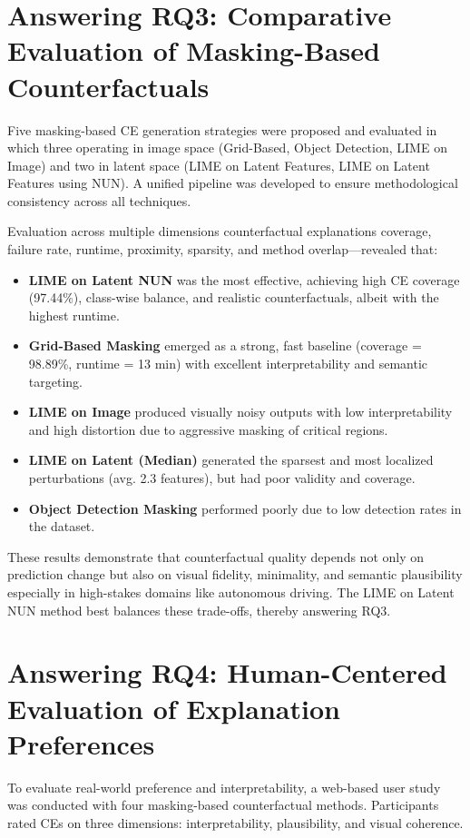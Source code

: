 \section{Answering RQ3: Comparative Evaluation of Masking-Based Counterfactuals}

Five masking-based CE generation strategies were proposed and evaluated in which three operating in image space (Grid-Based, Object Detection, LIME on Image) and two in latent space (LIME on Latent Features, LIME on Latent Features using NUN). A unified pipeline was developed to ensure methodological consistency across all techniques.

Evaluation across multiple dimensions counterfactual explanations coverage, failure rate, runtime, proximity, sparsity, and method overlap—revealed that:

\begin{itemize}
    \item \textbf{LIME on Latent NUN} was the most effective, achieving high CE coverage (97.44\%), class-wise balance, and realistic counterfactuals, albeit with the highest runtime.
    \item \textbf{Grid-Based Masking} emerged as a strong, fast baseline (coverage = 98.89\%, runtime = 13 min) with excellent interpretability and semantic targeting.
    \item \textbf{LIME on Image} produced visually noisy outputs with low interpretability and high distortion due to aggressive masking of critical regions.
    \item \textbf{LIME on Latent (Median)} generated the sparsest and most localized perturbations (avg. 2.3 features), but had poor validity and coverage.
    \item \textbf{Object Detection Masking} performed poorly due to low detection rates in the dataset.
\end{itemize}

These results demonstrate that counterfactual quality depends not only on prediction change but also on visual fidelity, minimality, and semantic plausibility especially in high-stakes domains like autonomous driving. The LIME on Latent NUN method best balances these trade-offs, thereby answering RQ3.

\section{Answering RQ4: Human-Centered Evaluation of Explanation Preferences}

To evaluate real-world preference and interpretability, a web-based user study was conducted with four masking-based counterfactual methods. Participants rated CEs on three dimensions: interpretability, plausibility, and visual coherence.

